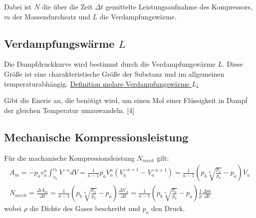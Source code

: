     Dabei ist $N$ die über die Zeit $\Delta t$ gemittelte Leistungsaufnahme des Kompressors, $m$
    der Massendurchsatz und $L$ die Verdampfungswärme.

\subsection*{Verdampfungswärme $L$}
Die Dampfdruckkurve wird bestimmt durch die Verdampfungswärme $L$.
Diese Größe ist eine charakteristische Größe der Substanz und im allgemeinen temperaturabhängig.
\uline{Definition molare Verdampfungswärme $L$:}
\begin{flushleft}
Gibt die Enerie an, die benötigt wird, um einen Mol einer Flüssigkeit in Dampf
der gleichen Temperatur umzuwandeln. 
\cite{Verdampfungswärme}[4]
\end{flushleft}




\subsection*{Mechanische Kompressionsleistung}
Für die machanische Kompressionsleistung $N_{mech}$ gilt:
\begin{gather}
    A_m=-p_av_a^{\kappa}\int_{v_a}^{v_b} V^{-\kappa}dV=\frac{1}{\kappa -1}p_aV_a^{\kappa}(V_b^{-\kappa +1}-V_a^{-\kappa+1})=\frac{1}{\kappa-1}(p_b\sqrt[\kappa]{\frac{p_a}{p_b}}-p_a) V_a \label{eqn:kompress} \\
    N_{mech}=\frac{\Delta A_m}{\Delta t}=\frac{1}{\kappa -1}(p_b\sqrt[\kappa]{\frac{p_a}{p_b}}-p_a)\frac{\Delta V_A}{\Delta t}=\frac{1}{\kappa -1}(p_b\sqrt[\kappa]{\frac{p_a}{p_b}}-p_a)\frac{1}{\rho}\frac{\Delta m}{\Delta t}\label{eqn:kompress2}
\end{gather}
wobei $\rho$ die Dichte des Gases beschreibt und $p_a$ den Druck.



